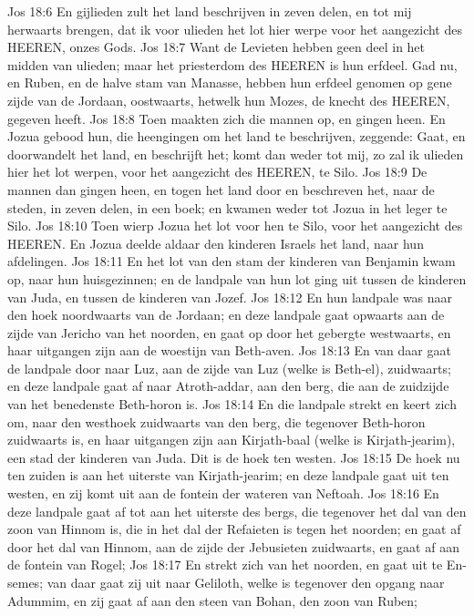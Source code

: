 Jos 18:6  En gijlieden zult het land beschrijven in zeven delen, en tot mij herwaarts brengen, dat ik voor ulieden het lot hier werpe voor het aangezicht des HEEREN, onzes Gods.
Jos 18:7  Want de Levieten hebben geen deel in het midden van ulieden; maar het priesterdom des HEEREN is hun erfdeel. Gad nu, en Ruben, en de halve stam van Manasse, hebben hun erfdeel genomen op gene zijde van de Jordaan, oostwaarts, hetwelk hun Mozes, de knecht des HEEREN, gegeven heeft.
Jos 18:8  Toen maakten zich die mannen op, en gingen heen. En Jozua gebood hun, die heengingen om het land te beschrijven, zeggende: Gaat, en doorwandelt het land, en beschrijft het; komt dan weder tot mij, zo zal ik ulieden hier het lot werpen, voor het aangezicht des HEEREN, te Silo.
Jos 18:9  De mannen dan gingen heen, en togen het land door en beschreven het, naar de steden, in zeven delen, in een boek; en kwamen weder tot Jozua in het leger te Silo.
Jos 18:10  Toen wierp Jozua het lot voor hen te Silo, voor het aangezicht des HEEREN. En Jozua deelde aldaar den kinderen Israels het land, naar hun afdelingen.
Jos 18:11  En het lot van den stam der kinderen van Benjamin kwam op, naar hun huisgezinnen; en de landpale van hun lot ging uit tussen de kinderen van Juda, en tussen de kinderen van Jozef.
Jos 18:12  En hun landpale was naar den hoek noordwaarts van de Jordaan; en deze landpale gaat opwaarts aan de zijde van Jericho van het noorden, en gaat op door het gebergte westwaarts, en haar uitgangen zijn aan de woestijn van Beth-aven.
Jos 18:13  En van daar gaat de landpale door naar Luz, aan de zijde van Luz (welke is Beth-el), zuidwaarts; en deze landpale gaat af naar Atroth-addar, aan den berg, die aan de zuidzijde van het benedenste Beth-horon is.
Jos 18:14  En die landpale strekt en keert zich om, naar den westhoek zuidwaarts van den berg, die tegenover Beth-horon zuidwaarts is, en haar uitgangen zijn aan Kirjath-baal (welke is Kirjath-jearim), een stad der kinderen van Juda. Dit is de hoek ten westen.
Jos 18:15  De hoek nu ten zuiden is aan het uiterste van Kirjath-jearim; en deze landpale gaat uit ten westen, en zij komt uit aan de fontein der wateren van Neftoah.
Jos 18:16  En deze landpale gaat af tot aan het uiterste des bergs, die tegenover het dal van den zoon van Hinnom is, die in het dal der Refaieten is tegen het noorden; en gaat af door het dal van Hinnom, aan de zijde der Jebusieten zuidwaarts, en gaat af aan de fontein van Rogel;
Jos 18:17  En strekt zich van het noorden, en gaat uit te En-semes; van daar gaat zij uit naar Geliloth, welke is tegenover den opgang naar Adummim, en zij gaat af aan den steen van Bohan, den zoon van Ruben;

